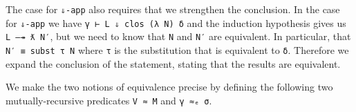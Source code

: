 The case for \texttt{⇓-app} also requires that we strengthen the
conclusion. In the case for \texttt{⇓-app} we have
\texttt{γ\ ⊢\ L\ ⇓\ clos\ (λ\ N)\ δ} and the induction hypothesis gives
us \texttt{L\ —↠\ ƛ\ N′}, but we need to know that \texttt{N} and
\texttt{N′} are equivalent. In particular, that
\texttt{N′\ ≡\ subst\ τ\ N} where \texttt{τ} is the substitution that is
equivalent to \texttt{δ}. Therefore we expand the conclusion of the
statement, stating that the results are equivalent.

We make the two notions of equivalence precise by defining the following
two mutually-recursive predicates \texttt{V\ ≈\ M} and
\texttt{γ\ ≈ₑ\ σ}.

\begin{fence}
\begin{code}%
\>[0]\AgdaSpace{}%
\AgdaSymbol{:}\AgdaSpace{}%
\AgdaSpace{}%
\AgdaSpace{}%
\AgdaSymbol{(}\AgdaSpace{}%
\AgdaSpace{}%
\AgdaSymbol{)}\AgdaSpace{}%
\AgdaSpace{}%
\<%
\\
\>[0]\AgdaSpace{}%
\AgdaSymbol{:}\AgdaSpace{}%
\AgdaSymbol{\}}\AgdaSpace{}%
\AgdaSpace{}%
\AgdaSpace{}%
\AgdaSpace{}%
\AgdaSpace{}%
\AgdaSpace{}%
\AgdaSpace{}%
\AgdaSpace{}%
\AgdaSpace{}%
\<%
\\
%
\\[\AgdaEmptyExtraSkip]%
\>[0]\AgdaSymbol{(}\AgdaSpace{}%
\AgdaSymbol{\{}\AgdaSymbol{\}}\AgdaSpace{}%
\AgdaSpace{}%
\AgdaSymbol{)}\AgdaSpace{}%
\AgdaSpace{}%
\AgdaSpace{}%
\AgdaSymbol{=}\AgdaSpace{}%
\AgdaFunction{Σ[}\AgdaSpace{}%
\AgdaSpace{}%
\AgdaSpace{}%
\AgdaSpace{}%
\AgdaSpace{}%
\AgdaSpace{}%
\AgdaFunction{]}\AgdaSpace{}%
\AgdaSpace{}%
\AgdaSpace{}%
\AgdaSpace{}%
\AgdaSpace{}%
\AgdaSymbol{(}\AgdaSpace{}%
\AgdaSpace{}%
\AgdaSpace{}%
\AgdaSpace{}%
\AgdaSymbol{)}\<%
\\
%
\\[\AgdaEmptyExtraSkip]%
\>[0]\AgdaSpace{}%
\AgdaSpace{}%
\AgdaSpace{}%
\AgdaSymbol{=}\AgdaSpace{}%
\AgdaSymbol{\}}\AgdaSpace{}%
\AgdaSpace{}%
\AgdaSymbol{(}\AgdaSpace{}%
\AgdaSymbol{)}\AgdaSpace{}%
\AgdaSpace{}%
\AgdaSymbol{(}\AgdaSpace{}%
\AgdaSymbol{)}\<%
\end{code}
\end{fence}

